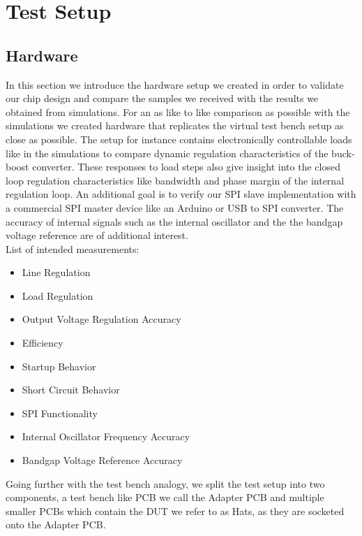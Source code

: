 \section{Test Setup}
\label{sec:testsetup}
\subsection{Hardware}
\label{sec:hardware}
In this section we introduce the hardware setup we created in order to validate our chip design and compare the samples we received with the results we obtained from simulations. For an as like to like comparison as possible with the simulations we created hardware that replicates the virtual test bench setup as close as possible. The setup for instance contains electronically controllable loads like in the simulations to compare dynamic regulation characteristics of the buck-boost converter. These responses to load steps also give insight into the closed loop regulation characteristics like bandwidth and phase margin of the internal regulation loop. An additional goal is to verify our SPI slave implementation with a commercial SPI master device like an Arduino or USB to SPI converter. The accuracy of internal signals such as the internal oscillator and the the bandgap voltage reference are of additional interest. \\
List of intended measurements:
\begin{itemize}
    \item Line Regulation
    \item Load Regulation
    \item Output Voltage Regulation Accuracy 
    \item Efficiency
    \item Startup Behavior
    \item Short Circuit Behavior
    \item SPI Functionality
    \item Internal Oscillator Frequency Accuracy
    \item Bandgap Voltage Reference Accuracy
\end{itemize}

Going further with the test bench analogy, we split the test setup into two components, a test bench like PCB we call the Adapter PCB and multiple smaller PCBs which contain the \ac{DUT} we refer to as Hats, as they are socketed onto the Adapter PCB.


